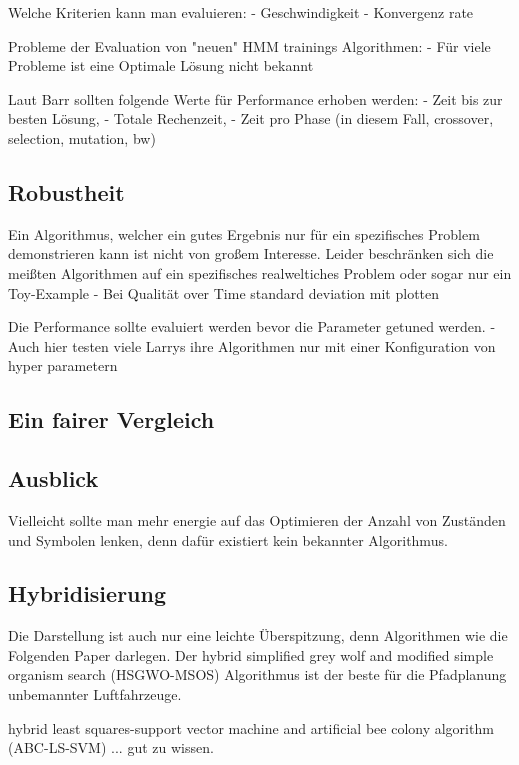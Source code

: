 Welche Kriterien kann man evaluieren:
- Geschwindigkeit
- Konvergenz rate


Probleme der Evaluation von "neuen" HMM trainings Algorithmen:
- Für viele Probleme ist eine Optimale Lösung nicht bekannt


Laut Barr sollten folgende Werte für Performance erhoben werden:
- Zeit bis zur besten Lösung,
- Totale Rechenzeit,
- Zeit pro Phase (in diesem Fall, crossover, selection, mutation, bw)


\subsection*{Robustheit}
Ein Algorithmus, welcher ein gutes Ergebnis nur für ein spezifisches Problem demonstrieren kann
ist nicht von großem Interesse.
Leider beschränken sich die meißten Algorithmen auf ein spezifisches realweltiches Problem oder 
sogar nur ein Toy-Example
- Bei Qualität over Time standard deviation mit plotten

Die Performance sollte evaluiert werden bevor die Parameter getuned werden.
- Auch hier testen viele Larrys ihre Algorithmen nur mit einer Konfiguration von hyper parametern

\subsection*{Ein fairer Vergleich}

\subsection*{Ausblick}
Vielleicht sollte man mehr energie auf das Optimieren der Anzahl von Zuständen und Symbolen lenken, denn dafür existiert kein bekannter Algorithmus.

\subsection*{Hybridisierung}
Die Darstellung ist auch nur eine leichte Überspitzung, denn Algorithmen wie die Folgenden Paper darlegen.
Der hybrid simplified grey wolf and modified simple organism search (HSGWO-MSOS) Algorithmus ist der beste für die Pfadplanung unbemannter Luftfahrzeuge. 

hybrid least squares-support vector machine and artificial bee colony algorithm (ABC-LS-SVM)
... gut zu wissen. 



